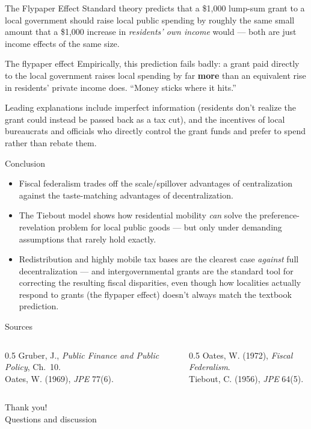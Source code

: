 \documentclass[11pt,aspectratio=169]{beamer}
\begin{document}
\begin{frame}{The Flypaper Effect}
  Standard theory predicts that a \$1,000 lump-sum grant to a local government should raise local public spending by roughly the same small amount that a \$1,000 increase in \emph{residents' own income} would --- both are just income effects of the same size.
  \begin{alertblock}{The flypaper effect}
    Empirically, this prediction fails badly: a grant paid directly to the local government raises local spending by far \textbf{more} than an equivalent rise in residents' private income does. ``Money sticks where it hits.''
  \end{alertblock}
  \small Leading explanations include imperfect information (residents don't realize the grant could instead be passed back as a tax cut), and the incentives of local bureaucrats and officials who directly control the grant funds and prefer to spend rather than rebate them.
\end{frame}

\begin{frame}{Conclusion}
  \begin{itemize}
    \item Fiscal federalism trades off the scale/spillover advantages of centralization against the taste-matching advantages of decentralization.
    \item The Tiebout model shows how residential mobility \emph{can} solve the preference-revelation problem for local public goods --- but only under demanding assumptions that rarely hold exactly.
    \item Redistribution and highly mobile tax bases are the clearest case \emph{against} full decentralization --- and intergovernmental grants are the standard tool for correcting the resulting fiscal disparities, even though how localities actually respond to grants (the flypaper effect) doesn't always match the textbook prediction.
  \end{itemize}
\end{frame}

\begin{frame}{Sources}
  \tiny
  \begin{columns}[T]
    \begin{column}{0.5\textwidth}
      Gruber, J., \emph{Public Finance and Public Policy}, Ch.\ 10.\\
      Oates, W. (1969), \emph{JPE} 77(6).
    \end{column}
    \begin{column}{0.5\textwidth}
      Oates, W. (1972), \emph{Fiscal Federalism}.\\
      Tiebout, C. (1956), \emph{JPE} 64(5).
    \end{column}
  \end{columns}
\end{frame}

\begin{frame}[standout]
  Thank you!\\
  \vspace{0.5em}
  \small Questions and discussion
\end{frame}
\end{document}
